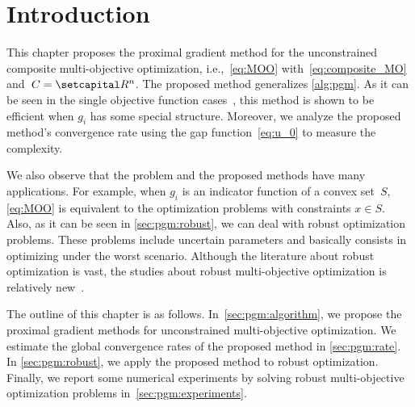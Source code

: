 \documentclass[../main]{subfiles}
\begin{document}
\section{Introduction} \label{sec:pgm:intro}
This chapter proposes the proximal gradient method for the unconstrained composite multi-objective optimization, i.e.,~\cref{eq:MOO} with~\cref{eq:composite_MO} and~$C = \setR^n$.
The proposed method generalizes \cref{alg:pgm}.
As it can be seen in the single objective function cases~\cite{Beck2009,Tseng2010}, this method is shown to be efficient when $g_i$ has some special structure.
Moreover, we analyze the proposed method's convergence rate using the gap function~\cref{eq:u_0} to measure the complexity.

We also observe that the problem and the proposed methods have many applications. For example, when $g_i$ is an indicator function of a convex set~$S$, \cref{eq:MOO} is equivalent to the optimization problems with constraints $x \in S$. Also, as it can be seen in \cref{sec:pgm:robust}, we can deal with robust optimization problems. These problems include uncertain parameters and basically consists in optimizing under the worst scenario. Although the literature about robust optimization is vast, the studies about robust multi-objective optimization is relatively new~\cite{Ehrgott2014,Fliege2014,Morishita2016}.

The outline of this chapter is as follows.
In~\cref{sec:pgm:algorithm}, we propose the proximal gradient methods for unconstrained multi-objective optimization.
We estimate the global convergence rates of the proposed method in \cref{sec:pgm:rate}.
In \cref{sec:pgm:robust}, we apply the proposed method to robust optimization.
Finally, we report some numerical experiments by solving robust multi-objective optimization problems in~\ref{sec:pgm:experiments}.
\end{document}
